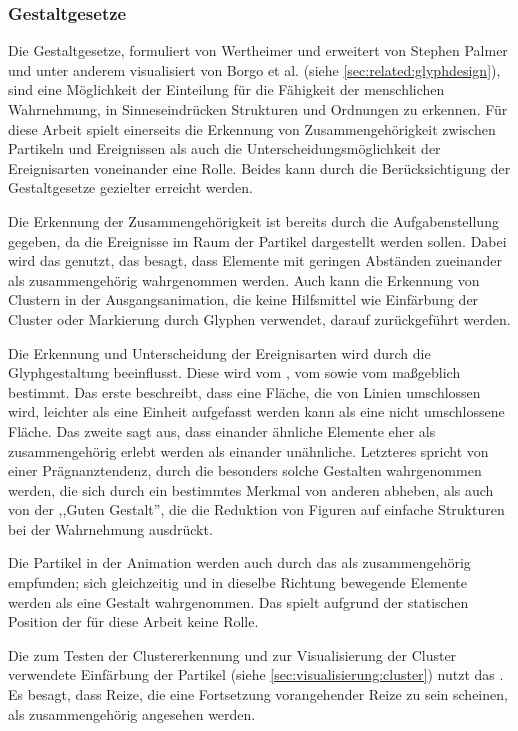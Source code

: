 \subsubsection{Gestaltgesetze}\label{sec:grundlagen:gestaltgesetze}
Die Gestaltgesetze, formuliert von Wertheimer und erweitert von Stephen Palmer und unter anderem visualisiert von Borgo et al. (siehe \autoref{sec:related:glyphdesign}), sind eine Möglichkeit der Einteilung für die Fähigkeit der menschlichen Wahrnehmung, in Sinneseindrücken Strukturen und Ordnungen zu erkennen. Für diese Arbeit spielt einerseits die Erkennung von Zusammengehörigkeit zwischen Partikeln und Ereignissen als auch die Unterscheidungsmöglichkeit der Ereignisarten voneinander eine Rolle. Beides kann durch die Berücksichtigung der Gestaltgesetze gezielter erreicht werden.

Die Erkennung der Zusammengehörigkeit ist bereits durch die Aufgabenstellung gegeben, da die Ereignisse im Raum der Partikel dargestellt werden sollen. Dabei wird das  genutzt, das besagt, dass Elemente mit geringen Abständen zueinander als zusammengehörig wahrgenommen werden. Auch kann die Erkennung von Clustern in der Ausgangsanimation, die keine Hilfsmittel wie Einfärbung der Cluster oder Markierung durch Glyphen verwendet, darauf zurückgeführt werden.

Die Erkennung und Unterscheidung der Ereignisarten wird durch die Glyphgestaltung beeinflusst. Diese wird vom , vom  sowie vom  maßgeblich bestimmt. Das erste beschreibt, dass eine Fläche, die von Linien umschlossen wird, leichter als eine Einheit aufgefasst werden kann als eine nicht umschlossene Fläche. Das zweite sagt aus, dass einander ähnliche Elemente eher als zusammengehörig erlebt werden als einander unähnliche. Letzteres spricht von einer Prägnanztendenz, durch die besonders solche Gestalten wahrgenommen werden, die sich durch ein bestimmtes Merkmal von anderen abheben, als auch von der ,,Guten Gestalt'', die die Reduktion von Figuren auf einfache Strukturen bei der Wahrnehmung ausdrückt.

Die Partikel in der Animation werden auch durch das  als zusammengehörig empfunden; sich gleichzeitig und in dieselbe Richtung bewegende Elemente werden als eine Gestalt wahrgenommen. Das spielt aufgrund der statischen Position der  für diese Arbeit keine Rolle.

Die zum Testen der Clustererkennung und zur Visualisierung der Cluster verwendete Einfärbung der Partikel (siehe \autoref{sec:visualisierung:cluster}) nutzt das . Es besagt, dass Reize, die eine Fortsetzung vorangehender Reize zu sein scheinen, als zusammengehörig angesehen werden.


